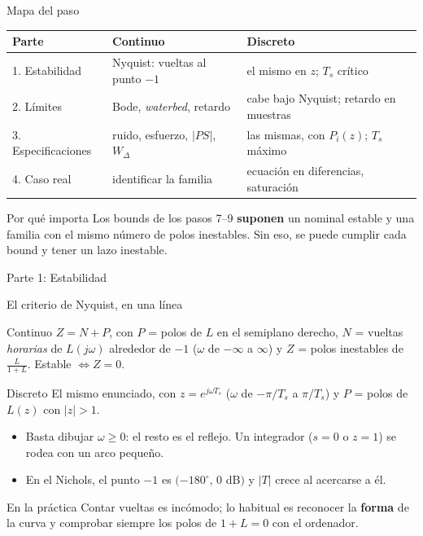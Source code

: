 \documentclass[aspectratio=169,11pt]{beamer}
\begin{document}
\begin{frame}{Mapa del paso}
  \small
  \begin{center}
  \begin{tabular}{l|l|l}
    Parte & Continuo & Discreto\\\hline
    1. Estabilidad & Nyquist: vueltas al punto $-1$ & el mismo en $z$; $T_s$ crítico\\[2pt]
    2. Límites & Bode, \emph{waterbed}, retardo & cabe bajo Nyquist; retardo en muestras\\[2pt]
    3. Especificaciones & ruido, esfuerzo, $|PS|$, $W_\Delta$ & las mismas, con $P_i(z)$; $T_s$ máximo\\[2pt]
    4. Caso real & identificar la familia & ecuación en diferencias, saturación
  \end{tabular}
  \end{center}
  \begin{alertblock}{Por qué importa}
    Los bounds de los pasos 7--9 \textbf{suponen} un nominal estable y una familia con el mismo número de polos inestables. Sin eso, se puede cumplir cada bound y tener un lazo inestable.
  \end{alertblock}
\end{frame}

\begin{frame}\centering\Large Parte 1: Estabilidad
\end{frame}

\begin{frame}{El criterio de Nyquist, en una línea}
  \small
  \begin{block}{Continuo}
    $Z=N+P$, con $P$ = polos de $L$ en el semiplano derecho, $N$ = vueltas \emph{horarias} de $L(j\omega)$ alrededor de $-1$ ($\omega$ de $-\infty$ a $\infty$) y $Z$ = polos inestables de $\frac{L}{1+L}$. Estable $\iff Z=0$.
  \end{block}
  \begin{block}{Discreto}
    El mismo enunciado, con $z=e^{j\omega T_s}$ ($\omega$ de $-\pi/T_s$ a $\pi/T_s$) y $P$ = polos de $L(z)$ con $|z|>1$.
  \end{block}
  \begin{itemize}
    \item Basta dibujar $\omega\ge0$: el resto es el reflejo. Un integrador ($s=0$ o $z=1$) se rodea con un arco pequeño.
    \item En el Nichols, el punto $-1$ es $(-180^\circ,\,0$ dB$)$ y $|T|$ crece al acercarse a él.
  \end{itemize}
  \begin{alertblock}{En la práctica}
    Contar vueltas es incómodo; lo habitual es reconocer la \textbf{forma} de la curva y comprobar siempre los polos de $1+L=0$ con el ordenador.
  \end{alertblock}
\end{frame}
\end{document}
